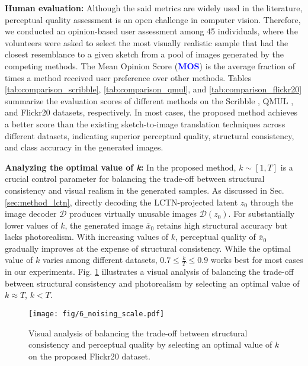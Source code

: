 \vspace{0.5em}

\noindent
\textbf{Human evaluation:} Although the said metrics are widely used in the literature, perceptual quality assessment is an open challenge in computer vision. Therefore, we conducted an opinion-based user assessment among 45 individuals, where the volunteers were asked to select the most visually realistic sample that had the closest resemblance to a given sketch from a pool of images generated by the competing methods. The Mean Opinion Score (\textbf{\textcolor{blue}{MOS}}) is the average fraction of times a method received user preference over other methods. Tables \ref{tab:comparison_scribble}, \ref{tab:comparison_qmul}, and \ref{tab:comparison_flickr20} summarize the evaluation scores of different methods on the Scribble \cite{ghosh2019interactive}, QMUL \cite{song2017deep,yu2016sketch}, and Flickr20 datasets, respectively. In most cases, the proposed method achieves a better score than the existing sketch-to-image translation techniques \cite{isola2017image,voynov2023sketch,xiang2022adversarial,zhu2017unpaired} across different datasets, indicating superior perceptual quality, structural consistency, and class accuracy in the generated images.

\vspace{0.5em}

\noindent
\textbf{Analyzing the optimal value of \emph{k}:}
In the proposed method, $k \sim [1, T]$ is a crucial control parameter for balancing the trade-off between structural consistency and visual realism in the generated samples. As discussed in Sec. \ref{sec:method_lctn}, directly decoding the LCTN-projected latent $z_0$ through the image decoder $\mathcal{D}$ produces virtually unusable images $\mathcal{D}(z_0)$. For substantially lower values of $k$, the generated image $\overline{x}_0$ retains high structural accuracy but lacks photorealism. With increasing values of $k$, perceptual quality of $\overline{x}_0$ gradually improves at the expense of structural consistency. While the optimal value of $k$ varies among different datasets, $0.7 \leqslant \frac{k}{T} \leqslant 0.9$ works best for most cases in our experiments. Fig. \ref{fig:noising_scale} illustrates a visual analysis of balancing the trade-off between structural consistency and photorealism by selecting an optimal value of $k \approx T$, $k < T$.

\vspace{-0.5em}

\begin{figure}[h]
  \centering
  \texttt{[image: fig/6\_noising\_scale.pdf]}
  \caption{Visual analysis of balancing the trade-off between structural consistency and perceptual quality by selecting an optimal value of $k$ on the proposed Flickr20 dataset.}
  \label{fig:noising_scale}
\end{figure}

